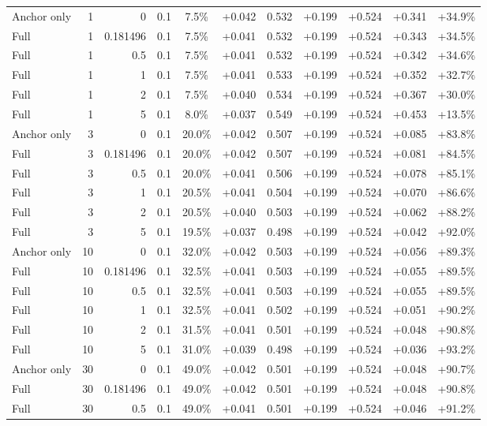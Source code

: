 \begin{table}[htbp]
\begin{tabular}{lrrrccccccc}
Anchor only & 1 & 0 & 0.1 & 7.5\% & +0.042 & 0.532 & +0.199 & +0.524 & +0.341 & +34.9\% \\
Full & 1 & 0.181496 & 0.1 & 7.5\% & +0.041 & 0.532 & +0.199 & +0.524 & +0.343 & +34.5\% \\
Full & 1 & 0.5 & 0.1 & 7.5\% & +0.041 & 0.532 & +0.199 & +0.524 & +0.342 & +34.6\% \\
Full & 1 & 1 & 0.1 & 7.5\% & +0.041 & 0.533 & +0.199 & +0.524 & +0.352 & +32.7\% \\
Full & 1 & 2 & 0.1 & 7.5\% & +0.040 & 0.534 & +0.199 & +0.524 & +0.367 & +30.0\% \\
Full & 1 & 5 & 0.1 & 8.0\% & +0.037 & 0.549 & +0.199 & +0.524 & +0.453 & +13.5\% \\
Anchor only & 3 & 0 & 0.1 & 20.0\% & +0.042 & 0.507 & +0.199 & +0.524 & +0.085 & +83.8\% \\
Full & 3 & 0.181496 & 0.1 & 20.0\% & +0.042 & 0.507 & +0.199 & +0.524 & +0.081 & +84.5\% \\
Full & 3 & 0.5 & 0.1 & 20.0\% & +0.041 & 0.506 & +0.199 & +0.524 & +0.078 & +85.1\% \\
Full & 3 & 1 & 0.1 & 20.5\% & +0.041 & 0.504 & +0.199 & +0.524 & +0.070 & +86.6\% \\
Full & 3 & 2 & 0.1 & 20.5\% & +0.040 & 0.503 & +0.199 & +0.524 & +0.062 & +88.2\% \\
Full & 3 & 5 & 0.1 & 19.5\% & +0.037 & 0.498 & +0.199 & +0.524 & +0.042 & +92.0\% \\
Anchor only & 10 & 0 & 0.1 & 32.0\% & +0.042 & 0.503 & +0.199 & +0.524 & +0.056 & +89.3\% \\
Full & 10 & 0.181496 & 0.1 & 32.5\% & +0.041 & 0.503 & +0.199 & +0.524 & +0.055 & +89.5\% \\
Full & 10 & 0.5 & 0.1 & 32.5\% & +0.041 & 0.503 & +0.199 & +0.524 & +0.055 & +89.5\% \\
Full & 10 & 1 & 0.1 & 32.5\% & +0.041 & 0.502 & +0.199 & +0.524 & +0.051 & +90.2\% \\
Full & 10 & 2 & 0.1 & 31.5\% & +0.041 & 0.501 & +0.199 & +0.524 & +0.048 & +90.8\% \\
Full & 10 & 5 & 0.1 & 31.0\% & +0.039 & 0.498 & +0.199 & +0.524 & +0.036 & +93.2\% \\
Anchor only & 30 & 0 & 0.1 & 49.0\% & +0.042 & 0.501 & +0.199 & +0.524 & +0.048 & +90.7\% \\
Full & 30 & 0.181496 & 0.1 & 49.0\% & +0.042 & 0.501 & +0.199 & +0.524 & +0.048 & +90.8\% \\
Full & 30 & 0.5 & 0.1 & 49.0\% & +0.041 & 0.501 & +0.199 & +0.524 & +0.046 & +91.2\% \\

\end{tabular}
\end{table}
